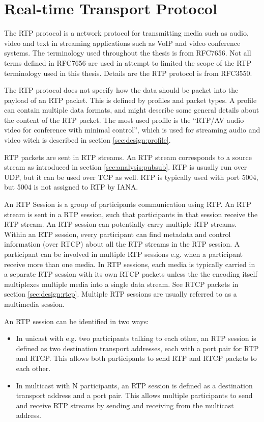 
\section{Real-time Transport Protocol} \label{sec:design:rtp}
The RTP protocol is a network protocol for transmitting media such as audio, video and text in streaming applications such as \ac{VoIP} and video conference systems. The terminology used throughout the thesis is from RFC7656\citep{RFC7656}. Not all terms defined in RFC7656 are used in attempt to limited the scope of the RTP terminology used in this thesis. Details are the RTP protocol is from RFC3550\citep{RFC3550}.

The RTP protocol does not specify how the data should be packet into the payload of an RTP packet. This is defined by profiles and packet types. A profile can contain multiple data formats, and might describe some general details about the content of the RTP packet.
The most used profile is the ``RTP/AV audio video for conference with minimal control'', which is used for streaming audio and video witch is described in section \ref{sec:design:profile}.

 \label{sec:design:rtpstream}
RTP packets are sent in RTP streams. An RTP stream corresponds to a source stream as introduced in section \ref{sec:analysis:pubsub}. RTP is usually run over UDP, but it can be used over TCP as well. RTP is typically used with port 5004, but 5004 is not assigned to RTP by IANA\citep{iana_ports}.


 \label{sec:design:rtpsession}
An RTP Session is a group of participants communication using RTP.
An RTP stream is sent in a RTP session, such that participants in that session receive the RTP stream. An RTP session can potentially carry multiple RTP streams. Within an RTP session, every participant can find metadata and control information (over RTCP) about all the RTP streams in the RTP session. A participant can be involved in multiple RTP sessions e.g. when a participant receive more than one media. In RTP sessions, each media is typically carried in a separate RTP session with its own RTCP packets unless the the encoding itself multiplexes multiple media into a single data stream. See RTCP packets in section \ref{sec:design:rtcp}. Multiple RTP sessions are usually referred to as a multimedia session.


An RTP session can be identified in two ways:
\begin{itemize}
	\item In unicast with e.g. two participants talking to each other, an RTP session is defined as two destination transport addresses, each with a port pair for RTP and RTCP. This allows both participants to send RTP and RTCP packets to each other.
	\item In multicast with N participants, an RTP session is defined as a destination transport address and a port pair. This allows multiple participants to send and receive RTP streams by sending and receiving from the multicast address.
\end{itemize}

